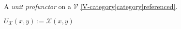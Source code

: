 
A \emph{unit profunctor} on a $\mathcal{V}$ \ref{V-category|category|referenced}.

$U_\mathcal{X}(x,y):=\mathcal{X}(x,y)$
